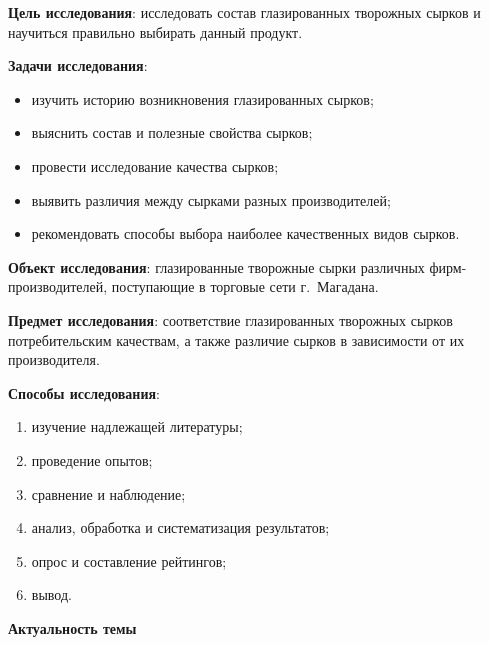 \bigskip
{}



\makeProcTitleSchool


\textbf{Цель исследования}: исследовать состав глазированных творожных сырков и научиться правильно выбирать данный продукт.

\textbf{Задачи исследования}:
\begin{itemize}[noitemsep]\vspace{-8pt}
\item изучить историю возникновения глазированных сырков;
\item выяснить состав и полезные свойства сырков;
\item провести исследование качества сырков;
\item выявить различия между сырками разных производителей;
\item рекомендовать способы выбора наиболее качественных видов сырков.
\end{itemize}\vspace{-8pt}

\textbf{Объект исследования}: глазированные творожные сырки различных фирм-произ\-во\-ди\-те\-лей, поступающие в торговые сети г.~Магадана.

\textbf{Предмет исследования}: соответствие глазированных творожных сырков потребительским качествам, а также различие сырков в зависимости от их производителя.

\textbf{Способы исследования}:
\begin{enumerate}[noitemsep]\vspace{-8pt}
\item изучение надлежащей литературы;
\item проведение опытов;
\item сравнение и наблюдение;
\item анализ, обработка и систематизация результатов;
\item опрос и составление рейтингов;
\item вывод.
\end{enumerate}\vspace{-8pt}

\textbf{Актуальность темы}

